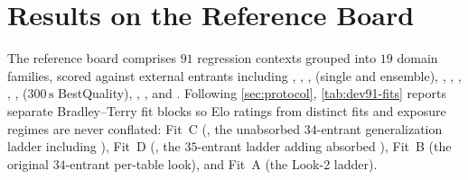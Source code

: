 \section{Results on the  Reference Board}
\label{sec:results-dev91}



The  reference board comprises $91$ regression contexts grouped into $19$ domain families, scored against external entrants including ,  \citep{zhang2026limix2}, ,  (single and ensemble), , , , , ,  ($300\,\mathrm{s}$ BestQuality), , , and . Following \cref{sec:protocol}, \cref{tab:dev91-fits} reports separate Bradley--Terry fit blocks so Elo ratings from distinct fits and exposure regimes are never conflated: Fit~C (, the unabsorbed $34$-entrant generalization ladder including ), Fit~D (, the $35$-entrant ladder adding absorbed ), Fit~B (the original $34$-entrant  per-table look), and Fit~A (the Look-2  ladder).

